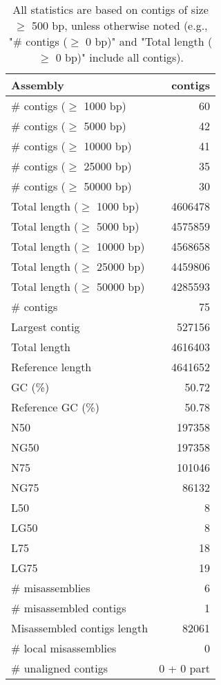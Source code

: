 \documentclass[12pt,a4paper]{article}
\begin{document}
\begin{table}[ht]
\begin{center}
\caption{All statistics are based on contigs of size $\geq$ 500 bp, unless otherwise noted (e.g., "\# contigs ($\geq$ 0 bp)" and "Total length ($\geq$ 0 bp)" include all contigs).}
\begin{tabular}{|l*{1}{|r}|}
\hline
Assembly & contigs \\ \hline
\# contigs ($\geq$ 1000 bp) & 60 \\ \hline
\# contigs ($\geq$ 5000 bp) & 42 \\ \hline
\# contigs ($\geq$ 10000 bp) & 41 \\ \hline
\# contigs ($\geq$ 25000 bp) & 35 \\ \hline
\# contigs ($\geq$ 50000 bp) & 30 \\ \hline
Total length ($\geq$ 1000 bp) & 4606478 \\ \hline
Total length ($\geq$ 5000 bp) & 4575859 \\ \hline
Total length ($\geq$ 10000 bp) & 4568658 \\ \hline
Total length ($\geq$ 25000 bp) & 4459806 \\ \hline
Total length ($\geq$ 50000 bp) & 4285593 \\ \hline
\# contigs & 75 \\ \hline
Largest contig & 527156 \\ \hline
Total length & 4616403 \\ \hline
Reference length & 4641652 \\ \hline
GC (\%) & 50.72 \\ \hline
Reference GC (\%) & 50.78 \\ \hline
N50 & 197358 \\ \hline
NG50 & 197358 \\ \hline
N75 & 101046 \\ \hline
NG75 & 86132 \\ \hline
L50 & 8 \\ \hline
LG50 & 8 \\ \hline
L75 & 18 \\ \hline
LG75 & 19 \\ \hline
\# misassemblies & 6 \\ \hline
\# misassembled contigs & 1 \\ \hline
Misassembled contigs length & 82061 \\ \hline
\# local misassemblies & 0 \\ \hline
\# unaligned contigs & 0 + 0 part \\ \hline

\end{tabular}
\end{center}
\end{table}
\end{document}
